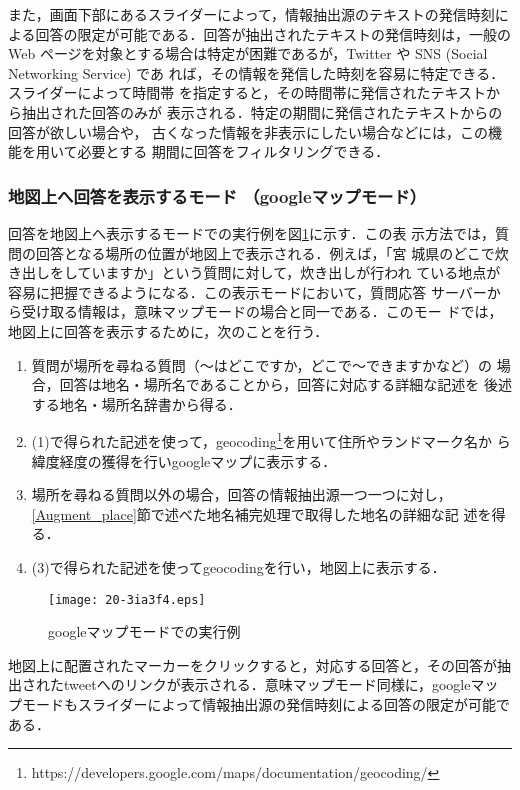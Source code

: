 \documentclass[japanese]{jnlp_1.4}
\begin{document}
また，画面下部にあるスライダーによって，情報抽出源のテキストの発信時刻に
よる回答の限定が可能である．回答が抽出されたテキストの発信時刻は，一般の
Web ページを対象とする場合は特定が困難であるが，Twitter や SNS (Social
Networking Service) であ
れば，その情報を発信した時刻を容易に特定できる．スライダーによって時間帯
を指定すると，その時間帯に発信されたテキストから抽出された回答のみが
表示される．特定の期間に発信されたテキストからの回答が欲しい場合や，
古くなった情報を非表示にしたい場合などには，この機能を用いて必要とする
期間に回答をフィルタリングできる．


\subsubsection{地図上へ回答を表示するモード （googleマップモード）}

回答を地図上へ表示するモードでの実行例を図\ref{google_map}に示す．この表
示方法では，質問の回答となる場所の位置が地図上で表示される．例えば，「宮
城県のどこで炊き出しをしていますか」という質問に対して，炊き出しが行われ
ている地点が容易に把握できるようになる．この表示モードにおいて，質問応答
サーバーから受け取る情報は，意味マップモードの場合と同一である．このモー
ドでは，地図上に回答を表示するために，次のことを行う．
\begin{enumerate}
\item 質問が場所を尋ねる質問（〜はどこですか，どこで〜できますかなど）の
      場合，回答は地名・場所名であることから，回答に対応する詳細な記述を
      後述する地名・場所名辞書から得る．
\item (1)で得られた記述を使って，geocoding\footnote{https://developers.google.com/maps/documentation/geocoding/}を用いて住所やランドマーク名か
      ら緯度経度の獲得を行いgoogleマップに表示する．
\item 場所を尋ねる質問以外の場合，回答の情報抽出源一つ一つに対し，
      \ref{Augment_place}節で述べた地名補完処理で取得した地名の詳細な記
      述を得る．
\item (3)で得られた記述を使ってgeocodingを行い，地図上に表示する．
\end{enumerate}

\begin{figure}[t]
\begin{center}
\texttt{[image: 20-3ia3f4.eps]}
\end{center}
\caption{googleマップモードでの実行例}
\label{google_map}
\end{figure}

地図上に配置されたマーカーをクリックすると，対応する回答と，その回答が抽
出されたtweetへのリンクが表示される．意味マップモード同様に，googleマッ
プモードもスライダーによって情報抽出源の発信時刻による回答の限定が可能で
ある．
\end{document}

